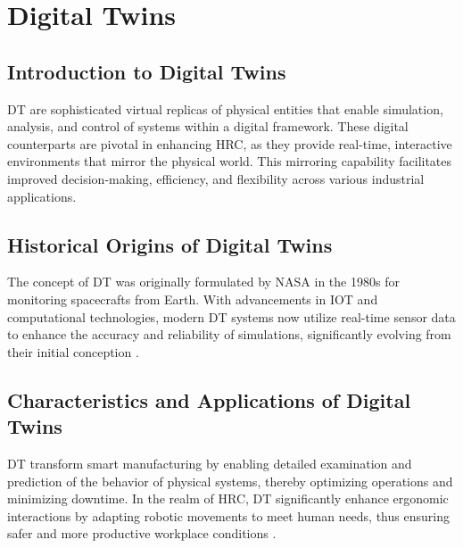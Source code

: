 



\section{Digital Twins}

\subsection{Introduction to Digital Twins}
\ac{DT} are sophisticated virtual replicas of physical entities that enable simulation, analysis, and control of systems within a digital framework. 
These digital counterparts are pivotal in enhancing \ac{HRC}, as they provide real-time, interactive environments that mirror the physical world. 
This mirroring capability facilitates improved decision-making, efficiency, and flexibility across various industrial applications.

\subsection{Historical Origins of Digital Twins}
The concept of \ac{DT} was originally formulated by NASA in the 1980s for monitoring spacecrafts from Earth. With advancements in \ac{IOT} and 
computational technologies, modern \ac{DT} systems now utilize real-time sensor data to enhance the accuracy and reliability of simulations, 
significantly evolving from their initial conception \cite{NASA-reference}.

\subsection{Characteristics and Applications of Digital Twins}
\ac{DT} transform smart manufacturing by enabling detailed examination and prediction of the behavior of physical systems, thereby optimizing operations 
and minimizing downtime. In the realm of \ac{HRC}, \ac{DT} significantly enhance ergonomic interactions by adapting robotic movements to meet human needs,
thus ensuring safer and more productive workplace conditions \cite{8477101}.

